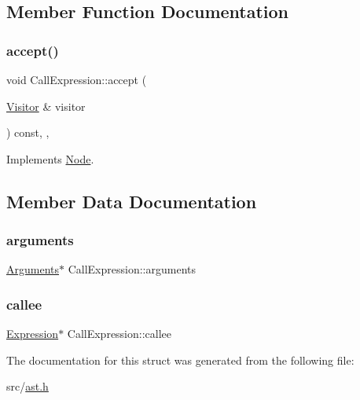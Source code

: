 \subsection{Member Function Documentation}
\mbox{\label{struct_call_expression_a5be626b61944a97f2a6015b632432513}} 
\subsubsection{\texorpdfstring{accept()}{accept()}}
{\footnotesize\ttfamily void Call\+Expression\+::accept (\begin{DoxyParamCaption}\item[{\hyperlink{struct_visitor}{Visitor} \&}]{visitor }\end{DoxyParamCaption}) const\hspace{0.3cm}{\ttfamily [inline]}, {\ttfamily [override]}, {\ttfamily [virtual]}}



Implements \hyperlink{struct_node_a10bd7af968140bbf5fa461298a969c71}{Node}.



\subsection{Member Data Documentation}
\mbox{\label{struct_call_expression_ad2dad57df529ef1ef06b43cd438598bd}} 
\subsubsection{\texorpdfstring{arguments}{arguments}}
{\footnotesize\ttfamily \hyperlink{struct_arguments}{Arguments}$\ast$ Call\+Expression\+::arguments}

\mbox{\label{struct_call_expression_a2d77ccd1a2d6f34d718063f0eb47bc21}} 
\subsubsection{\texorpdfstring{callee}{callee}}
{\footnotesize\ttfamily \hyperlink{struct_expression}{Expression}$\ast$ Call\+Expression\+::callee}



The documentation for this struct was generated from the following file\+:\begin{DoxyCompactItemize}
\item 
src/\hyperlink{ast_8h}{ast.\+h}\end{DoxyCompactItemize}
